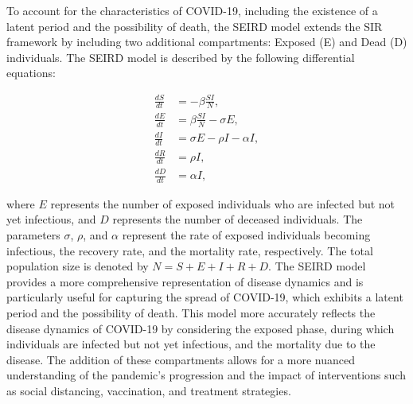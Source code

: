 \documentclass[12pt]{article}
\begin{document}
To account for the characteristics of COVID-19, including the existence of a latent period and the possibility of death, the SEIRD model extends the SIR framework by including two additional compartments: Exposed (E) and Dead (D) individuals. The SEIRD model is described by the following differential equations:

\begin{equation}
    \begin{align}
        \frac{dS}{dt} &= -\beta \frac{SI}{N}, \\
        \frac{dE}{dt} &= \beta \frac{SI}{N} - \sigma E, \\
        \frac{dI}{dt} &= \sigma E - \rho I - \alpha I, \\
        \frac{dR}{dt} &= \rho I, \\
        \frac{dD}{dt} &= \alpha I,
    \end{align}
\end{equation}

where $E$ represents the number of exposed individuals who are infected but not yet infectious, and $D$ represents the number of deceased individuals. The parameters $\sigma$, $\rho$, and $\alpha$ represent the rate of exposed individuals becoming infectious, the recovery rate, and the mortality rate, respectively. The total population size is denoted by $N = S + E + I + R + D$. The SEIRD model provides a more comprehensive representation of disease dynamics and is particularly useful for capturing the spread of COVID-19, which exhibits a latent period and the possibility of death. This model more accurately reflects the disease dynamics of COVID-19 by considering the exposed phase, during which individuals are infected but not yet infectious, and the mortality due to the disease. The addition of these compartments allows for a more nuanced understanding of the pandemic's progression and the impact of interventions such as social distancing, vaccination, and treatment strategies.
\end{document}
